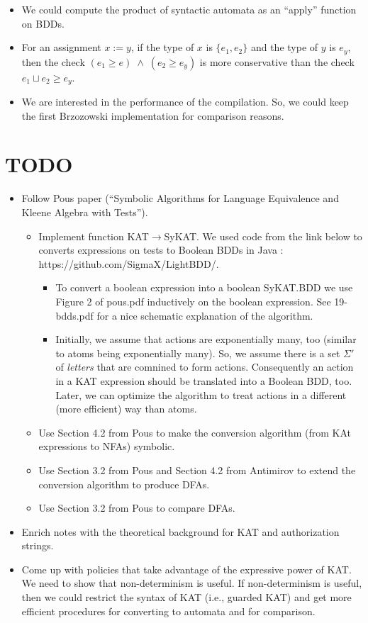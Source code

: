 \documentclass[10pt]{article}
\begin{document}
\begin{itemize}
\item We could compute the product of syntactic automata as an ``apply'' function on BDDs.
\item For an assignment $x:=y$, if the type of $x$ is $\{e_1,e_2\}$ and the type of $y$ is $e_y$, then the check $(e_1\geq e)\;\wedge\;(e_2\geq e_y)$ is more conservative than the check $e_1\sqcup e_2\geq e_y$.
\item We are interested in the performance of the compilation. So, we could keep the first Brzozowski implementation for comparison reasons.
\end{itemize}

\section*{TODO}
\begin{itemize}
\item Follow Pous paper (``Symbolic Algorithms for Language Equivalence and Kleene Algebra with Tests'').
\begin{itemize}
\item Implement function KAT$\rightarrow$SyKAT. We used code from the link below to  converts expressions on tests to Boolean BDDs in Java : https://github.com/SigmaX/LightBDD/.
\begin{itemize}
\item To convert a boolean expression into a boolean SyKAT.BDD we use Figure 2 of pous.pdf inductively on the boolean expression. See 19-bdds.pdf for a nice schematic explanation of the algorithm.
\item Initially, we assume that actions are exponentially many, too (similar to atoms being exponentially many). So, we assume there is a set $\Sigma'$ of \emph{letters} that are comnined to form actions. Consequently an action in a KAT expression should be translated into a  Boolean BDD, too. Later, we can optimize the algorithm to treat actions in a different (more efficient) way than atoms.
\end{itemize}
\item Use Section 4.2 from Pous to make the conversion algorithm (from KAt expressions to NFAs) symbolic.
\item Use Section 3.2 from Pous and Section 4.2 from Antimirov to extend the conversion algorithm to produce DFAs.
\item Use Section 3.2 from Pous to compare DFAs.
\end{itemize}  
\item Enrich notes with the theoretical background for KAT and authorization strings.
\item Come up with policies that take advantage of the expressive power of KAT. We need to show that non-determinism is useful. If non-determinism is useful, then we could restrict the syntax of KAT (i.e., guarded KAT) and get more efficient procedures for converting to automata and for comparison.
\end{itemize}
\end{document}
